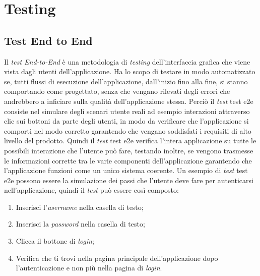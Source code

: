 
\chapter{Testing}
\label{cap:test}
\section{Test End to End}
Il \emph{test End-to-End} è una metodologia di \emph{testing} dell'interfaccia grafica che viene vista dagli utenti dell'applicazione. Ha lo scopo di testare in modo automatizzato se, tutti flussi di esecuzione dell'applicazione, dall'inizio fino alla fine, si stanno comportando come progettato, senza che vengano rilevati degli errori che andrebbero a inficiare sulla qualità dell’applicazione stessa. Perciò il \emph{test} \gls{test e2e} consiste nel simulare degli scenari utente reali ad esempio interazioni attraverso clic sui bottoni da parte degli utenti, in modo da verificare che l'applicazione si comporti nel modo corretto garantendo che vengano soddisfati i requisiti di alto livello del prodotto. Quindi il \emph{test} \gls{test e2e} verifica l'intera applicazione su tutte le possibili interazione che l'utente può fare, testando inoltre, se vengono trasmesse le informazioni corrette tra le varie componenti dell'applicazione garantendo che l'applicazione funzioni come un unico sistema coerente. Un esempio di \emph{test} \gls{test e2e} possono essere la simulazione dei passi che l'utente deve fare per autenticarsi nell'applicazione, quindi il \emph{test} può essere così composto:
\begin{enumerate}
	\item Inserisci l'\emph{username} nella casella di testo;
	\item Inserisci la \emph{password} nella casella di testo;
	\item Clicca il bottone di \emph{login};
	\item Verifica che ti trovi nella pagina principale dell'applicazione dopo l'autenticazione e non più nella pagina di \emph{login}.
\end{enumerate}

